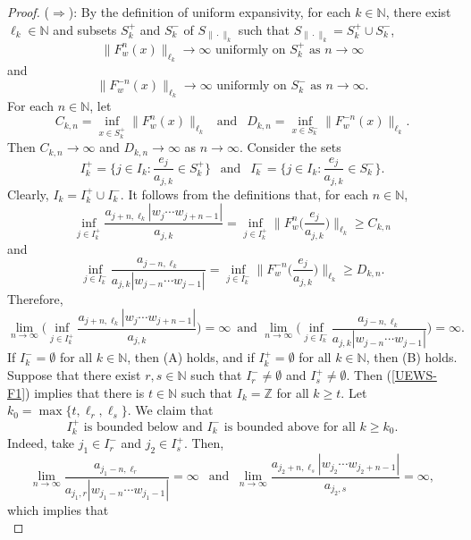 \documentclass[12pt]{amsart}
\theoremstyle{theorem}
\theoremstyle{definition}
\theoremstyle{remark} \theoremstyle{question} \theoremstyle{example}
\newcommand{\N}{\mathbb{N}}   %
\newcommand{\Z}{\mathbb{Z}}   %
\begin{document}
\begin{proof}
($\Rightarrow$): By the definition of uniform expansivity, for each $k \in \N$, there exist $\ell_k \in \N$ 
and subsets $S_k^+$ and $S_k^-$ of $S_{\|\cdot\|_k}$ such that $S_{\|\cdot\|_k} = S_k^+ \cup S_k^-$,
\[
\|F_w^n(x)\|_{\ell_k} \to \infty \text{ uniformly on } S_k^+ \text{ as } n \to \infty
\]
and
\[
\|F_w^{-n}(x)\|_{\ell_k} \to \infty \text{ uniformly on } S_k^- \text{ as } n \to \infty.
\]
For each $n \in \N$, let
\[
C_{k,n} = \inf_{x \in S_k^+} \|F_w^n(x)\|_{\ell_k} \ \ \text{ and } \ \ D_{k,n} = \inf_{x \in S_k^-} \|F_w^{-n}(x)\|_{\ell_k}.
\]
Then $C_{k,n} \to \infty$ and $D_{k,n} \to \infty$ as $n \to \infty$. Consider the sets
\[
I_k^+ = \Big\{j \in I_k : \frac{e_j}{a_{j,k}} \in S_k^+\Big\} \ \ \text{ and } \ \ I_k^- = \Big\{j \in I_k : \frac{e_j}{a_{j,k}} \in S_k^-\Big\}.
\]
Clearly, $I_k = I_k^+ \cup I_k^-$. It follows from the definitions that, for each $n \in \N$,
\[
\inf_{j \in I_k^+} \frac{a_{j+n,\ell_k} |w_j \cdots w_{j+n-1}|}{a_{j,k}} 
  = \inf_{j \in I_k^+} \Big\|F_w^n\Big(\frac{e_j}{a_{j,k}}\Big)\Big\|_{\ell_k} \geq C_{k,n}
\]
and
\[
\inf_{j \in I_k^-} \frac{a_{j-n,\ell_k}}{a_{j,k} |w_{j-n} \cdots w_{j-1}|} 
  = \inf_{j \in I_k^-} \Big\|F_w^{-n}\Big(\frac{e_j}{a_{j,k}}\Big)\Big\|_{\ell_k} \geq D_{k,n}.
\]
Therefore, 
\begin{equation}\label{UEWS-F1}
\lim_{n \to \infty} \Big(\inf_{j \in I_k^+} \frac{a_{j+n,\ell_k} |w_j \cdots w_{j+n-1}|}{a_{j,k}}\Big) = \infty\, \text{ and }
\lim_{n \to \infty} \Big(\inf_{j \in I_k^-} \frac{a_{j-n,\ell_k}}{a_{j,k} |w_{j-n} \cdots w_{j-1}|}\Big) = \infty.
\end{equation}
If $I_k^- = \emptyset$ for all $k \in \N$, then (A) holds, and if $I_k^+ = \emptyset$ for all $k \in \N$, then (B) holds.
Suppose that there exist $r,s \in \N$ such that $I_r^- \neq \emptyset$ and $I_s^+ \neq \emptyset$.
Then (\ref{UEWS-F1}) implies that there is $t \in \N$ such that $I_k = \Z$ for all $k \geq t$.
Let $k_0 = \max\{t,\ell_r,\ell_s\}$. We claim that
\begin{equation}\label{UEWS-F2}
I_k^+ \text{ is bounded below and } I_k^- \text{ is bounded above for all } k \geq k_0.
\end{equation}
Indeed, take $j_1 \in I_r^-$ and $j_2 \in I_s^+$. Then,
\[
\lim_{n \to \infty} \frac{a_{j_1-n,\ell_r}}{a_{j_1,r} |w_{j_1-n} \cdots w_{j_1-1}|} = \infty \ \ \text{ and } \
\lim_{n \to \infty} \frac{a_{j_2+n,\ell_s} |w_{j_2} \cdots w_{j_2+n-1}|}{a_{j_2,s}} = \infty,
\]
which implies that
\begin{equation}\label{UEWS-F3}

\end{equation}
\end{proof}
\end{document}
